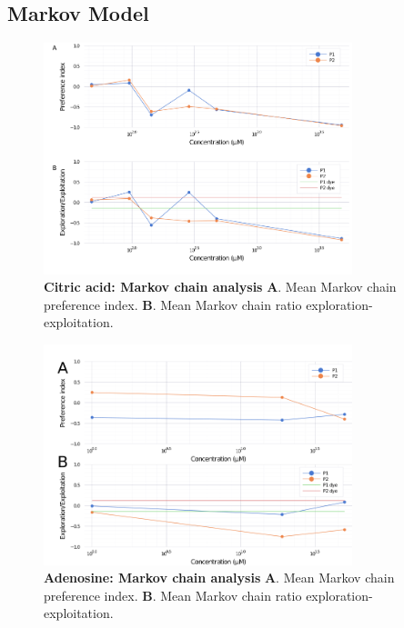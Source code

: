 \begin{appendices}
  \chapter{Markov Model}
    \begin{figure}[h]
      \centering
      \includegraphics[width=0.8\textwidth]{part_2/assets/citricacid_markov.png}
      \caption{\textbf{Citric acid: Markov chain analysis} \textbf{A}. Mean Markov chain preference index. \textbf{B}. Mean Markov chain ratio exploration-exploitation.}
      \label{citric_acid_markov}
    \end{figure}
    \begin{figure}[h]
      \centering
      \includegraphics[width=0.8\textwidth]{part_2/assets/adenosine_markov.png}
      \caption{\textbf{Adenosine: Markov chain analysis} \textbf{A}. Mean Markov chain preference index. \textbf{B}. Mean Markov chain ratio exploration-exploitation.}
      \label{adenosine_markov}
    \end{figure}
    \begin{figure}[h]
      \centering

\end{figure}
\end{appendices}
